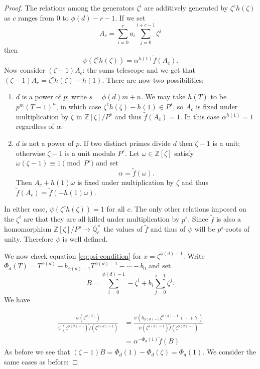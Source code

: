 \documentclass[11pt]{amsart}
\theoremstyle{plain}
\theoremstyle{definition}
\theoremstyle{remark}
\newcommand{\ZZ}{{\mathbb{Z}}}
\newcommand{\EE}{\mathbb{\bar Q}_\ell}
\begin{document}
\begin{proof}
The relations among the generators $\zeta^i$ are additively generated by $\zeta^ch(\zeta)$ as $c$ ranges from $0$ to $\phi(d)-r-1$.  If we set 
$$A_c = \sum_{i=0}^r a_i \sum_{j=0}^{i+c-1} \zeta^j$$
then
$$\psi(\zeta^ch(\zeta)) = \alpha^{h(1)} \tilde{f}(A_c).$$
Now consider $(\zeta - 1)A_c$: the sums telescope and we get that $(\zeta-1)A_c = \zeta^ch(\zeta) - h(1).$  There are now two possibilities:
\begin{enumerate}
\item $d$ is a power of $p$; write $s = \phi(d)m + n$.  We may take $h(T)$ to be $p^m(T-1)^n$, in which case $\zeta^ch(\zeta) - h(1) \in P^s$, so $A_c$ is fixed under multiplication by $\zeta$ in $\ZZ[\zeta]/P^s$ and thus $\tilde{f}(A_c) = 1$.  In this case $\alpha^{h(1)} = 1$ regardless of $\alpha$.
\item $d$ is not a power of $p$.  If two distinct primes divide $d$ then $\zeta - 1$ is a unit; otherwise $\zeta - 1$ is a unit modulo $P^s$.  Let $\omega \in \ZZ[\zeta]$ satisfy $\omega(\zeta - 1) \equiv 1 \pmod{P^s}$ and set
\begin{equation} \label{alpha-def}
\alpha = \tilde{f}(\omega).
\end{equation}
Then $A_c + h(1)\omega$ is fixed under multiplication by $\zeta$ and thus $\tilde{f}(A_c) = \tilde{f}(-h(1)\omega)$.
\end{enumerate}
In either case, $\psi(\zeta^ch(\zeta)) = 1$ for all $c$.  The only other relations imposed on the $\zeta^i$ are that they are all killed under multiplication by $p^s$.  Since $\tilde{f}$ is also a homomorphism $\ZZ[\zeta]/P^s \rightarrow \EE^\times$ the values of $\tilde{f}$ and thus of $\psi$ will be $p^s$-roots of unity.  Therefore $\psi$ is well defined.

We now check equation \ref{eq:psi-condition} for $x = \zeta^{\phi(d)-1}$.  Write $\Phi_d(T) = T^{\phi(d)} - b_{\phi(d)-1}T^{\phi(d)-1} - \cdots - b_0$ and set
$$B = \sum_{i=0}^{\phi(d)-1} -\zeta^i + b_i \sum_{j=0}^{i-1} \zeta^j.$$
We have

\begin{align*}
\frac{\psi(\zeta^{\phi(d)})}{\psi(\zeta^{\phi(d)-1})\tilde{f}(\zeta^{\phi(d)-1})} &= \frac{\psi(b_{\phi(d)-1}\zeta^{\phi(d)-1} + \cdots + b_0)}{\psi(\zeta^{\phi(d)-1})\tilde{f}(\zeta^{\phi(d)-1})} \\
&= \alpha^{-\Phi_d(1)} \tilde{f}(B)
\end{align*}
As before we see that $(\zeta - 1)B = \Phi_d(1) - \Phi_d(\zeta) = \Phi_d(1)$.  We consider the same cases as before:


\end{proof}
\end{document}
